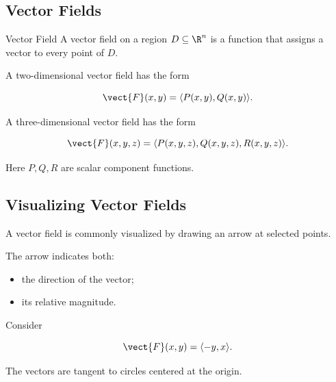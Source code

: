 \subsection{Vector Fields}
\label{subsec:vector-fields}

\begin{definitionbox}{Vector Field}
A vector field on a region \(D\subseteq\R^n\) is a function that assigns a
vector to every point of \(D\).
\end{definitionbox}

A two-dimensional vector field has the form

\[ \vect{F}(x,y)=\langle P(x,y),Q(x,y)\rangle. \]

A three-dimensional vector field has the form

\[ \vect{F}(x,y,z)=\langle P(x,y,z),Q(x,y,z),R(x,y,z)\rangle. \]

Here \(P,Q,R\) are scalar component functions.

\subsection{Visualizing Vector Fields}
\label{subsec:visualizing-vector-fields}

A vector field is commonly visualized by drawing an arrow at selected
points.

The arrow indicates both:

\begin{itemize}
    \item the direction of the vector;
    \item its relative magnitude.
\end{itemize}

Consider

\[ \vect{F}(x,y)=\langle-y,x\rangle. \]

The vectors are tangent to circles centered at the origin.

\begin{center}
\end{center}


